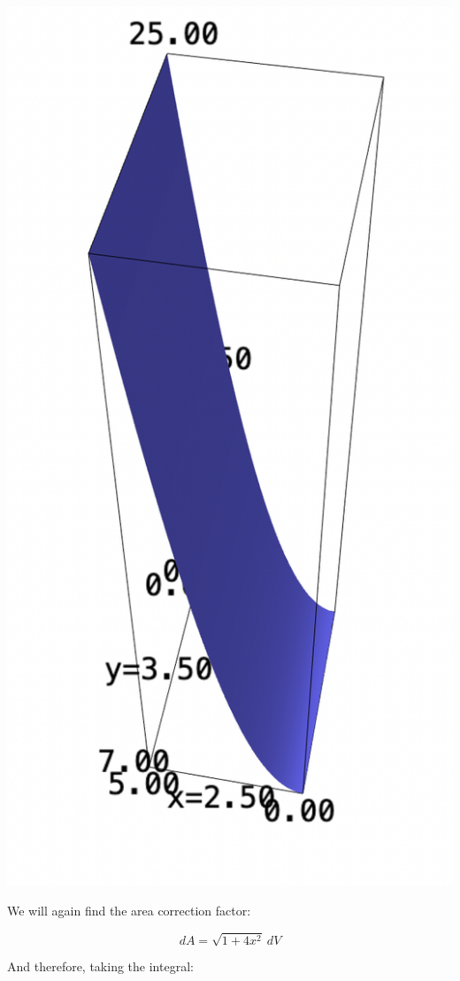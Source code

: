 \documentclass[letterpaper]{article}
\begin{document}
\begin{center}
\includegraphics[width=.9\linewidth]{2022-04-25_09-54-21_screenshot.png}
\end{center}


We will again find the area correction factor:

\begin{equation}
   dA = \sqrt{1+4x^2}\ dV
\end{equation}

And therefore, taking the integral:
\end{document}
